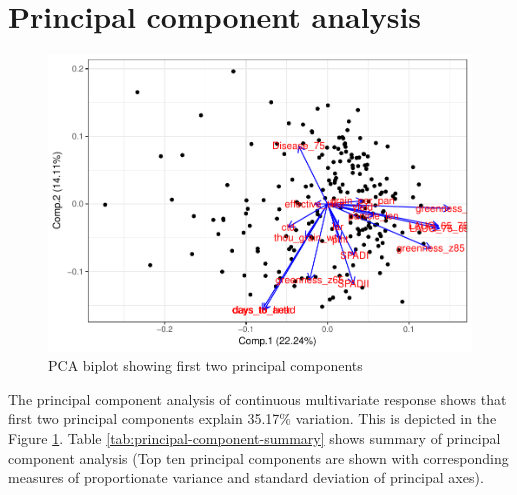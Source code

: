 \documentclass[12pt,oneside]{dukestatscithesis} %
\theoremstyle{definition}
\theoremstyle{definition}
\theoremstyle{definition}
\theoremstyle{remark}
\begin{document}
\section{Principal component
analysis}\label{principal-component-analysis}
\begin{figure}

{\centering \includegraphics{thesis_files/figure-latex/principal-component-viz-1} 

}

\caption{PCA biplot showing first two principal components}\label{fig:principal-component-viz}
\end{figure}
The principal component analysis of continuous multivariate response
shows that first two principal components explain 35.17\% variation.
This is depicted in the Figure \ref{fig:principal-component-viz}. Table
\ref{tab:principal-component-summary} shows summary of principal
component analysis (Top ten principal components are shown with
corresponding measures of proportionate variance and standard deviation
of principal axes).
\end{document}
